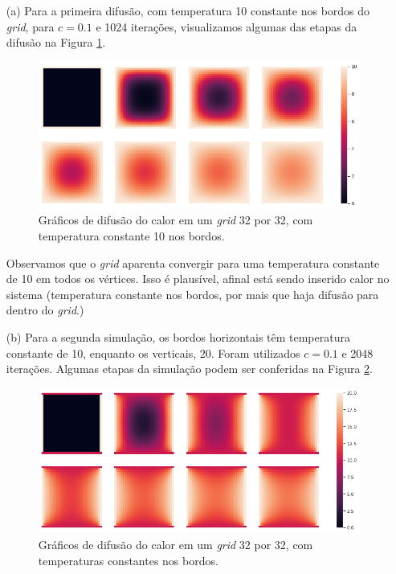 \documentclass{article}
\begin{document}
        \begin{itemize}
            \item[(a)] Para a primeira difusão, com temperatura 10 constante nos bordos do \textit{grid},
                para $c=0.1$ e 1024 iterações, visualizamos algumas das etapas da difusão na Figura \ref{fig:graph_1}.
                
                \begin{figure}[!h]
                    \includegraphics[width=\textwidth]{graph_1.png}
                    \caption{Gráficos de difusão do calor em um \textit{grid} 32 por 32, com temperatura constante 10 nos bordos.}
                    \label{fig:graph_1}
                \end{figure}

                Observamos que o \textit{grid} aparenta convergir para uma temperatura constante de 10 em todos os vértices.
                Isso é plausível, afinal está sendo inserido calor no sistema (temperatura constante nos bordos, por mais que haja difusão
                para dentro do \textit{grid}.)

            \item[(b)] Para a segunda simulação, os bordos horizontais têm temperatura constante de 10,
                enquanto os verticais, 20. Foram utilizados $c=0.1$ e 2048 iterações. Algumas etapas da simulação
                podem ser conferidas na Figura \ref{fig:graph_2}.
                
                \begin{figure}[!h]
                    \includegraphics[width=\textwidth]{graph_2.png}
                    \caption{Gráficos de difusão do calor em um \textit{grid} 32 por 32, com temperaturas constantes nos bordos.}
                    \label{fig:graph_2}
                \end{figure}


\end{itemize}
\end{document}
